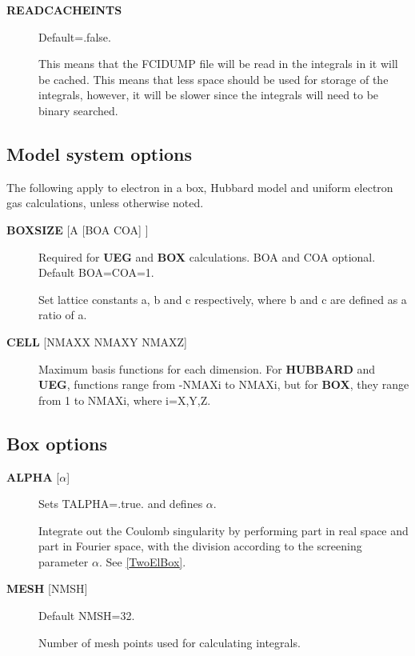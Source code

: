 \documentclass[openany,a4paper,10pt,english]{manual}
\begin{document}
\begin{description}
\item[\textbf{READCACHEINTS}] \leavevmode
Default=.false.

This means that the FCIDUMP file will be read in the integrals in it will be
cached. This means that less space should be used for storage of the integrals,
however, it will be slower since the integrals will need to be binary searched.

\end{description}


\subsection{Model system options}

The following apply to electron in a box, Hubbard model and uniform
electron gas calculations, unless otherwise noted.
\begin{description}
\item[\textbf{BOXSIZE} {[}A {[}BOA COA{]} {]}] \leavevmode
Required for \textbf{UEG} and \textbf{BOX} calculations.  BOA and COA optional. Default
BOA=COA=1.

Set lattice constants a, b and c respectively, where b and c are defined
as a ratio of a.

\item[\textbf{CELL} {[}NMAXX NMAXY NMAXZ{]}] \leavevmode
Maximum basis functions for each dimension.  For \textbf{HUBBARD} and \textbf{UEG},
functions range from -NMAXi to NMAXi, but for \textbf{BOX}, they range from 1
to NMAXi, where i=X,Y,Z.

\end{description}


\subsection{Box options}
\begin{description}
\item[\textbf{ALPHA} {[}$\alpha${]}] \leavevmode
Sets TALPHA=.true. and defines $\alpha$.

Integrate out the Coulomb singularity by performing part in real
space and part in Fourier space, with the division according to the
screening parameter $\alpha$.  See \hyperlink{twoelbox}{{[}TwoElBox{]}}.

\item[\textbf{MESH} {[}NMSH{]}] \leavevmode
Default NMSH=32.

Number of mesh points used for calculating integrals.

\end{description}
\end{document}
